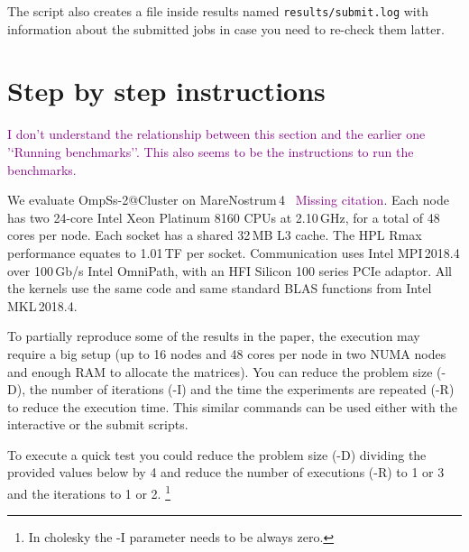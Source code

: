 \documentclass{article}
\newcommand{\paul}[1]{\textcolor{purple}{#1}}
\newcommand{\code}[1]{\texttt{#1}}
\begin{document}
The script also creates a file inside results named
\code{results/submit.log} with information about the submitted jobs in
case you need to re-check them latter.

\section{Step by step instructions}
\paul{I don't understand the relationship between this section and the earlier one '`Running benchmarks''. This also seems
to be the instructions to run the benchmarks.}

We evaluate OmpSs-2@Cluster on
MareNostrum\,4~\cite{MareNostrum4} \paul{Missing citation}. Each node has two 24-core Intel
Xeon Platinum 8160 CPUs at 2.10\,GHz, for a total of 48 cores per
node.  Each socket has a shared 32\,MB L3 cache.  The HPL Rmax
performance equates to 1.01\,TF per socket.  Communication uses Intel
MPI\,2018.4 over 100\,Gb/s Intel OmniPath, with an HFI Silicon 100
series PCIe adaptor.  All the kernels use the same code and same
standard BLAS functions from Intel MKL\,2018.4.

To partially reproduce some of the results in the paper, the execution
may require a big setup (up to 16 nodes and 48 cores per node in two
NUMA nodes and enough RAM to allocate the matrices). You can reduce
the problem size (-D), the number of iterations (-I) and the time the
experiments are repeated (-R) to reduce the execution time. This
similar commands can be used either with the interactive or the submit
scripts.

To execute a quick test you could reduce the problem size (-D)
dividing the provided values below by 4 and reduce the number of
executions (-R) to 1 or 3 and the iterations to 1 or 2. \footnote{In
  cholesky the -I parameter needs to be always zero.}
\end{document}
